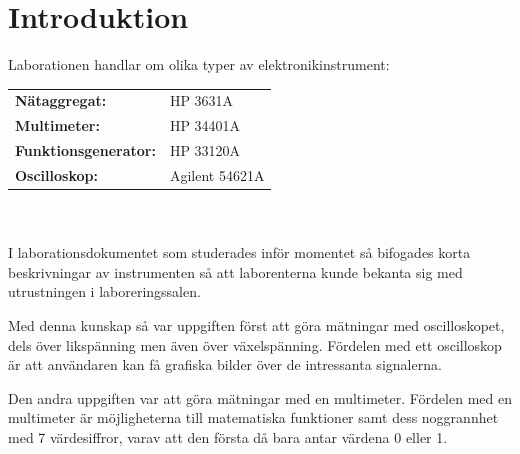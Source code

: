 \documentclass[11pt,a4paper]{article}
\begin{document}
\section{Introduktion}\label{setup}
Laborationen handlar om olika typer av elektronikinstrument:\\
\begin{tabular}{ll}
\rule{0pt}{3ex}\textbf{Nätaggregat:} & HP 3631A\\
\textbf{Multimeter:} & HP 34401A\\
\textbf{Funktionsgenerator:} & HP 33120A\\
\textbf{Oscilloskop:} & Agilent 54621A
\end{tabular}
\\
\\
I laborationsdokumentet som studerades inför momentet så bifogades korta
beskrivningar av instrumenten så att laborenterna kunde bekanta sig med 
utrustningen i laboreringssalen.\\
\par Med denna kunskap så var uppgiften först att göra mätningar med oscilloskopet, 
dels över likspänning men även över växelspänning. Fördelen med ett oscilloskop är 
att användaren kan få grafiska bilder över de intressanta signalerna. \par Den andra 
uppgiften var att göra mätningar med en multimeter. Fördelen med en multimeter är 
möjligheterna till matematiska funktioner samt dess noggrannhet med 7 värdesiffror, 
varav att den första då bara antar värdena 0 eller 1.
\end{document}
